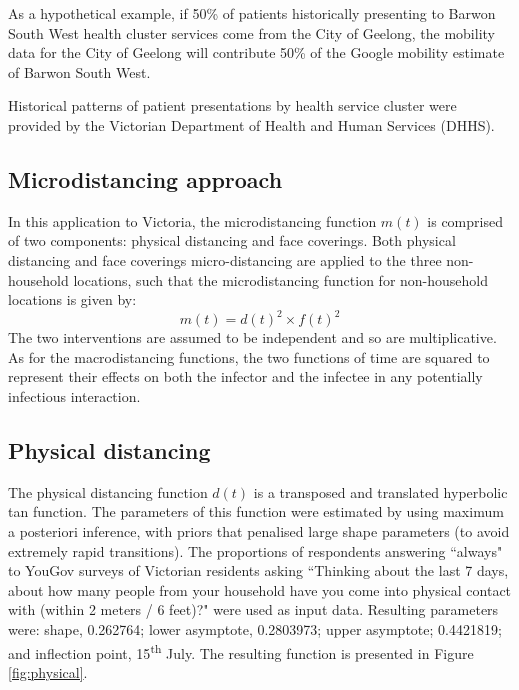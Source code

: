 As a hypothetical example, if 50\% of patients historically presenting to Barwon South West health cluster services come from the City of Geelong, the mobility data for the City of Geelong will contribute 50\% of the Google mobility estimate of Barwon South West.

Historical patterns of patient presentations by health service cluster were provided by the Victorian Department of Health and Human Services (DHHS).

\subsection{Microdistancing approach}
In this application to Victoria, the microdistancing function \(m(t)\) is comprised of two components: physical distancing and face coverings. Both physical distancing and face coverings micro-distancing are applied to the three non-household locations, such that the microdistancing function for non-household locations is given by: \[m(t)=d(t)^2\times f(t)^2\]
The two interventions are assumed to be independent and so are multiplicative. As for the macrodistancing functions, the two functions of time are squared to represent their effects on both the infector and the infectee in any potentially infectious interaction.

\subsection{Physical distancing}
The physical distancing function \(d(t)\) is a transposed and translated hyperbolic tan function. The parameters of this function were estimated by using maximum a posteriori inference, with priors that penalised large shape parameters (to avoid extremely rapid transitions). The proportions of respondents answering ``always" to YouGov surveys of Victorian residents asking ``Thinking about the last 7 days, about how many people from your household have you come into physical contact with (within 2 meters / 6 feet)?" were used as input data. Resulting parameters were: shape, 0.262764; lower asymptote, 0.2803973; upper asymptote; 0.4421819; and inflection point, 15\textsuperscript{th} July. The resulting function is presented in Figure \ref{fig:physical}.

